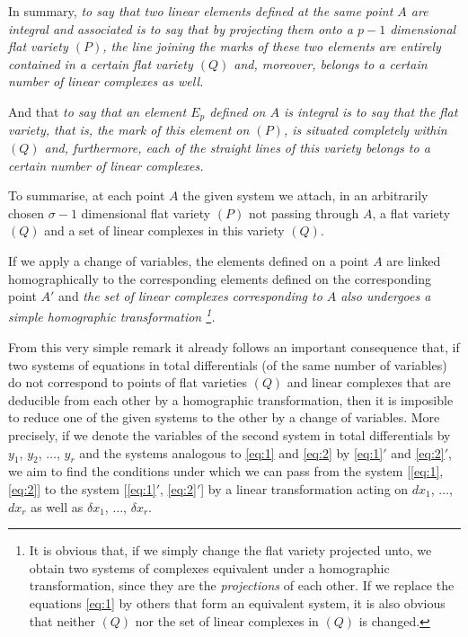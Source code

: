 \documentclass[leqno,11pt]{book}
\theoremstyle{shape1}
\theoremstyle{shapesmall}
\begin{document}
In summary, \emph{to say that two linear elements defined at the same point $A$ are integral and associated is to say that by projecting them onto a $p-1$ dimensional flat variety $(P)$, the line joining the marks of these two elements are entirely contained in a certain flat variety $(Q)$ and, moreover, belongs to a certain number of linear complexes as well.}

And that \emph{to say that an element $E_{p}$ defined on $A$ is integral is to say that the flat variety, that is, the mark of this element on $(P)$, is situated completely within $(Q)$ and, furthermore, each of the straight lines of this variety belongs to a certain number of linear complexes.}

To summarise, at each point $A$ the given system we attach, in an arbitrarily chosen $\sigma-1$ dimensional flat variety $(P)$ not passing through $A$, a flat variety $(Q)$ and a set of linear complexes in this variety $(Q)$.

If we apply a change of variables, the elements defined on a point $A$ are linked homographically to the corresponding elements defined on the corresponding point $A'$ and \emph{the set of linear complexes corresponding to $A$ also undergoes a simple homographic transformation \footnote{It is obvious that, if we simply change the flat variety projected unto, we obtain two systems of complexes equivalent under a homographic transformation, since they are the \emph{projections} of each other. If we replace the equations \eqref{eq:1} by others that form an equivalent system, it is also obvious that neither $(Q)$ nor the set of linear complexes in $(Q)$ is changed.}.}

From this very simple remark it already follows an important consequence that, if two systems of equations in total differentials (of the same number of variables) do not correspond to points of flat varieties $(Q)$ and linear complexes that are deducible from each other by a homographic transformation, then it is imposible to reduce one of the given systems to the other by a change of variables. More precisely, if we denote the variables of the second system in total differentials by $y_{1}$, $y_{2}$, $\dots$, $y_{r}$ and the systems analogous to \eqref{eq:1} and \eqref{eq:2} by \eqref{eq:1}$'$ and \eqref{eq:2}$'$, we aim to find the conditions under which we can pass from the system [\eqref{eq:1}, \eqref{eq:2}] to the system [\eqref{eq:1}$'$, \eqref{eq:2}$'$] by a linear transformation acting on $dx_{1}$, $\dots$, $dx_{r}$ as well as $\delta x_{1}$, $\dots$, $\delta x_{r}$.
\end{document}
